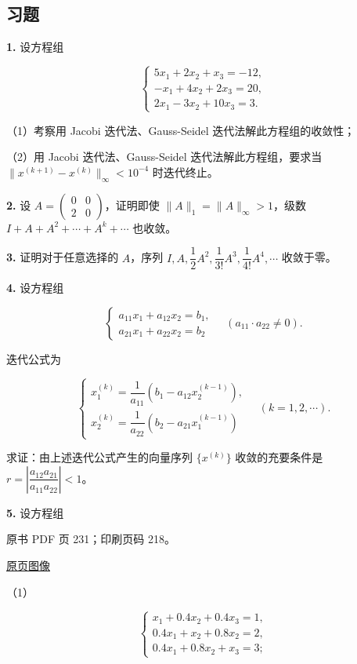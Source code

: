 \subsection{习题}\label{ch08-ux4e60ux9898}

\textbf{1.} 设方程组

\[
\begin{cases}
5x_1+2x_2+x_3=-12,\\
-x_1+4x_2+2x_3=20,\\
2x_1-3x_2+10x_3=3.
\end{cases}
\]

（1）考察用 Jacobi 迭代法、Gauss-Seidel 迭代法解此方程组的收敛性；

（2）用 Jacobi 迭代法、Gauss-Seidel 迭代法解此方程组，要求当 \(\|x^{(k+1)}-x^{(k)}\|_\infty<10^{-4}\) 时迭代终止。

\textbf{2.} 设 \(A=\begin{pmatrix}0&0\\2&0\end{pmatrix}\)，证明即使 \(\|A\|_1=\|A\|_\infty>1\)，级数 \(I+A+A^2+\cdots+A^k+\cdots\) 也收敛。

\textbf{3.} 证明对于任意选择的 \(A\)，序列 \(I,\allowbreak A,\allowbreak \dfrac12A^2,\allowbreak \dfrac1{3!}A^3,\allowbreak \dfrac1{4!}A^4,\allowbreak \cdots\) 收敛于零。

\textbf{4.} 设方程组

\[
\begin{cases}
a_{11}x_1+a_{12}x_2=b_1,\\
a_{21}x_1+a_{22}x_2=b_2
\end{cases}
\quad(a_{11}\cdot a_{22}\neq0).
\]

迭代公式为

\[
\begin{cases}
x_1^{(k)}=\dfrac1{a_{11}}(b_1-a_{12}x_2^{(k-1)}),\\[5pt]
x_2^{(k)}=\dfrac1{a_{22}}(b_2-a_{21}x_1^{(k-1)})
\end{cases}
\quad(k=1,2,\cdots).
\]

求证：由上述迭代公式产生的向量序列 \(\{x^{(k)}\}\) 收敛的充要条件是 \(r=\left|\dfrac{a_{12}a_{21}}{a_{11}a_{22}}\right|<1\)。

\textbf{5.} 设方程组

\clearpage

原书 PDF 页 231；印刷页码 218。

\href{source-images/pdf-231.jpeg}{原页图像}

（1）

\[
\begin{cases}
x_1+0.4x_2+0.4x_3=1,\\
0.4x_1+x_2+0.8x_2=2,\\
0.4x_1+0.8x_2+x_3=3;
\end{cases}
\]

